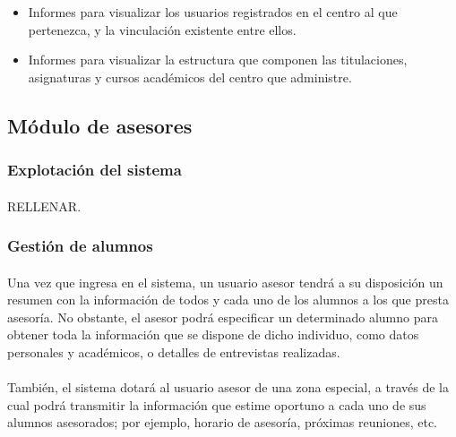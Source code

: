       \begin{itemize}
       \item Informes para visualizar los usuarios registrados en el centro
             al que pertenezca, y la vinculación existente entre ellos.
       \item Informes para visualizar la estructura que componen las
             titulaciones, asignaturas y cursos académicos del centro que
             administre.
      \end{itemize}

   \subsection{Módulo de asesores}

      \subsubsection{Explotación del sistema}

      \paragraph{}RELLENAR.

      \subsubsection{Gestión de alumnos}\label{gestAlumnos}

      \paragraph{}Una vez que ingresa en el sistema, un usuario asesor tendrá
      a su disposición un resumen con la información de todos y cada uno de los
      alumnos a los que presta asesoría. No obstante, el asesor podrá
      especificar un determinado alumno para obtener toda la información que
      se dispone de dicho individuo, como datos personales y académicos, o
      detalles de entrevistas realizadas.

      \paragraph{}También, el sistema dotará al usuario asesor de una
      zona especial, a través de la cual podrá transmitir la información que
      estime oportuno a cada uno de sus alumnos asesorados; por ejemplo, horario
      de asesoría, próximas reuniones, etc.

